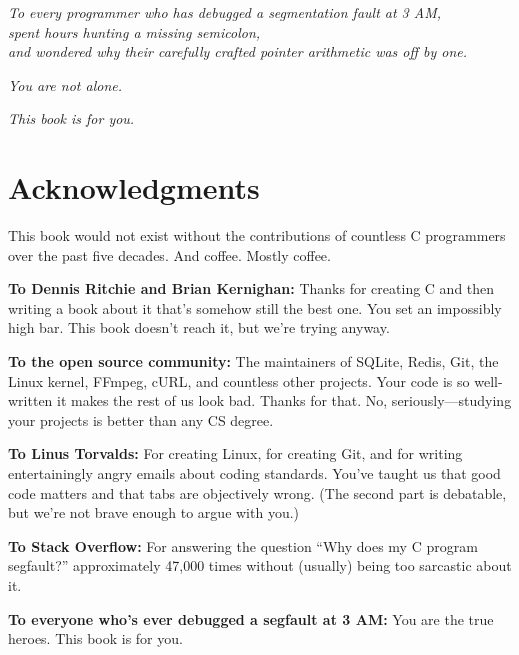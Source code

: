 \documentclass[11pt,openany]{book}
\begin{document}
\thispagestyle{empty}
\vspace*{3in}
\begin{center}
\textit{To every programmer who has debugged a segmentation fault at 3 AM,\\
spent hours hunting a missing semicolon,\\
and wondered why their carefully crafted pointer arithmetic was off by one.}

\vspace{2em}

\textit{You are not alone.}

\vspace{2em}

\textit{This book is for you.}
\end{center}
\vspace*{\fill}
\clearpage

\chapter*{Acknowledgments}

This book would not exist without the contributions of countless C programmers over the past five decades. And coffee. Mostly coffee.

\textbf{To Dennis Ritchie and Brian Kernighan:} Thanks for creating C and then writing a book about it that's somehow still the best one. You set an impossibly high bar. This book doesn't reach it, but we're trying anyway.

\textbf{To the open source community:} The maintainers of SQLite, Redis, Git, the Linux kernel, FFmpeg, cURL, and countless other projects. Your code is so well-written it makes the rest of us look bad. Thanks for that. No, seriously—studying your projects is better than any CS degree.

\textbf{To Linus Torvalds:} For creating Linux, for creating Git, and for writing entertainingly angry emails about coding standards. You've taught us that good code matters and that tabs are objectively wrong. (The second part is debatable, but we're not brave enough to argue with you.)

\textbf{To Stack Overflow:} For answering the question ``Why does my C program segfault?'' approximately 47,000 times without (usually) being too sarcastic about it.

\textbf{To everyone who's ever debugged a segfault at 3 AM:} You are the true heroes. This book is for you.
\end{document}
